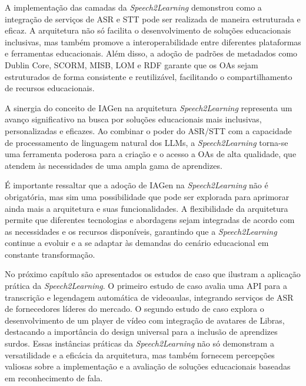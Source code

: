 A implementação das camadas da \textit{Speech2Learning} demonstrou como a integração de serviços de ASR e STT pode ser realizada de maneira estruturada e eficaz. A arquitetura não só facilita o desenvolvimento de soluções educacionais inclusivas, mas também promove a interoperabilidade entre diferentes plataformas e ferramentas educacionais. Além disso, a adoção de padrões de metadados como Dublin Core, SCORM, MISB, LOM e RDF garante que os OAs sejam estruturados de forma consistente e reutilizável, facilitando o compartilhamento de recursos educacionais.

A sinergia do conceito de IAGen na arquitetura \textit{Speech2Learning} representa um avanço significativo na busca por soluções educacionais mais inclusivas, personalizadas e eficazes. Ao combinar o poder do ASR/STT com a capacidade de processamento de linguagem natural dos LLMs, a \textit{Speech2Learning} torna-se uma ferramenta poderosa para a criação e o acesso a OAs de alta qualidade, que atendem às necessidades de uma ampla gama de aprendizes.

É importante ressaltar que a adoção de IAGen na \textit{Speech2Learning} não é obrigatória, mas sim uma possibilidade que pode ser explorada para aprimorar ainda mais a arquitetura e suas funcionalidades. A flexibilidade da arquitetura permite que diferentes tecnologias e abordagens sejam integradas de acordo com as necessidades e os recursos disponíveis, garantindo que a \textit{Speech2Learning} continue a evoluir e a se adaptar às demandas do cenário educacional em constante transformação.

No próximo capítulo são apresentados os estudos de caso que ilustram a aplicação prática da \textit{Speech2Learning}. O primeiro estudo de caso avalia uma API para a transcrição e legendagem automática de videoaulas, integrando serviços de ASR de fornecedores líderes do mercado. O segundo estudo de caso explora o desenvolvimento de um player de vídeo com integração de avatares de Libras, destacando a importância do design universal para a inclusão de aprendizes surdos. Essas instâncias práticas da \textit{Speech2Learning} não só demonstram a versatilidade e a eficácia da arquitetura, mas também fornecem percepções valiosas sobre a implementação e a avaliação de soluções educacionais baseadas em reconhecimento de fala.